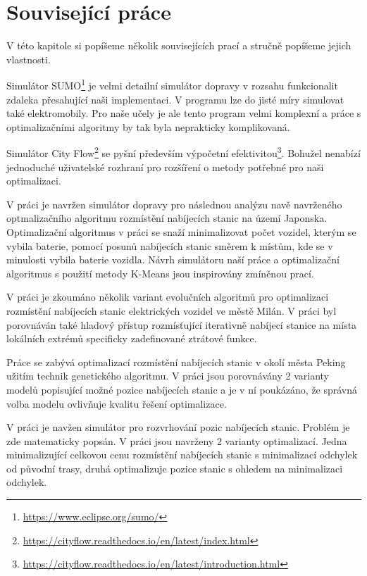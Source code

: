 \chapter{Související práce}
\label{chap:souvisejici_prace}

V této kapitole si popíšeme několik souvisejících prací a stručně popíšeme 
jejich vlastnosti.


Simulátor SUMO\footnote{\url{https://www.eclipse.org/sumo/}} je velmi detailní
simulátor dopravy v rozsahu funkcionalit zdaleka přesahující naši implementaci.
V programu lze do jisté míry simulovat také elektromobily. Pro naše učely je
ale tento program velmi komplexní a práce s optimalizačními algoritmy
by tak byla neprakticky komplikovaná.

Simulátor City Flow\footnote{\url{https://cityflow.readthedocs.io/en/latest/index.html}}
se pyšní především výpočetní efektivitou\footnote{\url{https://cityflow.readthedocs.io/en/latest/introduction.html}}.
Bohužel nenabízí jednoduché uživatelské rozhraní pro rozšíření o metody
potřebné pro naši optimalizaci.

V práci \citet{kmeans_layout} je navržen simulátor dopravy pro následnou 
analýzu navě navrženého optmalizačního algoritmu rozmístění nabíjecích stanic
na území Japonska. Optimalizační algoritmus v práci se snaží minimalizovat 
počet vozidel, kterým se vybila baterie, pomocí posunů nabíjecích stanic směrem
k místům, kde se v minulosti vybila baterie vozidla. Návrh simulátoru naší práce
a optimalizační algoritmus s použití metody K-Means jsou inspirovány zmíněnou
prací.

V práci \citet{niccolai2021optimization} je zkoumáno několik variant evolučních
algoritmů pro optimalizaci rozmístění nabíjecích stanic elektrických vozidel
ve městě Milán. V práci byl porovnáván také hladový přístup rozmísťující 
iterativně nabíjecí stanice na místa lokálních extrémů specificky zadefinované
ztrátové funkce. 

Práce \citet{zhu2016charging} se zabývá optimalizací rozmístění nabíjecích 
stanic v okolí města Peking užitím technik genetického algoritmu. V práci 
jsou porovnávány 2 varianty modelů popisující možné pozice nabíjecích stanic a
je v ní poukázáno, že správná volba modelu ovlivňuje kvalitu řešení optimalizace. 

V práci \citet{kinay2021full} je navžen simulátor pro rozvrhování pozic 
nabíjecích stanic. Problém je zde matematicky popsán. V práci jsou navrženy
2 varianty optimalizací. Jedna minimalizující celkovou cenu rozmístění 
nabíjecích stanic s minimalizací odchylek od původní trasy, druhá optimalizuje
pozice stanic s ohledem na minimalizaci odchylek.
